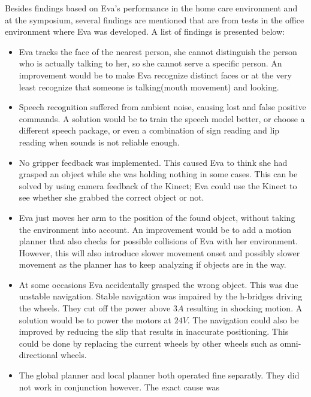 \documentclass[project_eva.tex]{subfiles}
\begin{document}
Besides findings based on Eva's performance in the home care environment and at the symposium, several findings are mentioned that are from tests in the office environment where Eva was developed. A list of findings is presented below:

\begin{itemize}
\item Eva tracks the face of the nearest person, she cannot distinguish the person who is actually talking to her, so she cannot serve a specific person. An improvement would be to make Eva recognize distinct faces or at the very least recognize that someone is talking(mouth movement) and looking.

\item Speech recognition suffered from ambient noise, causing lost and false positive commands. A solution would be to train the speech model better, or choose a different speech package, or even a combination of sign reading and lip reading when sounds is not reliable enough.
\item No gripper feedback was implemented. This caused Eva to think she had grasped an object while she was holding nothing in some cases. This can be solved by using camera feedback of the Kinect; Eva could use the Kinect to see whether she grabbed the correct object or not.
\item Eva just moves her arm to the position of the found object, without taking the environment into account. An improvement would be to add a motion planner that also checks for possible collisions of Eva with her environment. However, this will also introduce slower movement onset and possibly slower movement as the planner has to keep analyzing if objects are in the way.

\item  At some occasions Eva accidentally grasped the wrong object. This was due unstable navigation. Stable navigation was impaired by the h-bridges driving the wheels. They cut off the power above $3A$ resulting in shocking motion. A solution would be to power the motors at $24V$. The navigation could also be improved by reducing the slip  that results in inaccurate positioning. This could be done by replacing the current wheels by other wheels such as omni-directional wheels.
\item The global planner and local planner both operated fine separatly. They did not work in conjunction however.  The exact cause was 



\end{itemize}
\end{document}
